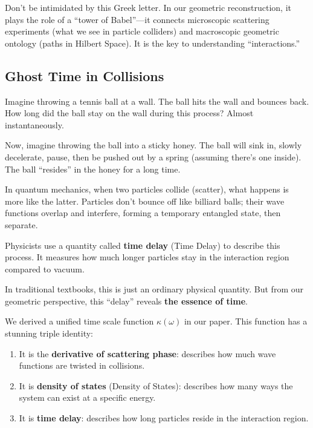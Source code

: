 \documentclass[11pt,a4paper,twoside]{book}
\begin{document}
Don't be intimidated by this Greek letter. In our geometric reconstruction, it plays the role of a ``tower of Babel''---it connects microscopic scattering experiments (what we see in particle colliders) and macroscopic geometric ontology (paths in Hilbert Space). It is the key to understanding ``interactions.''

\subsection{Ghost Time in Collisions}

Imagine throwing a tennis ball at a wall. The ball hits the wall and bounces back. How long did the ball stay on the wall during this process? Almost instantaneously.

Now, imagine throwing the ball into a sticky honey. The ball will sink in, slowly decelerate, pause, then be pushed out by a spring (assuming there's one inside). The ball ``resides'' in the honey for a long time.

In quantum mechanics, when two particles collide (scatter), what happens is more like the latter. Particles don't bounce off like billiard balls; their wave functions overlap and interfere, forming a temporary entangled state, then separate.

Physicists use a quantity called \textbf{time delay} (Time Delay) to describe this process. It measures how much longer particles stay in the interaction region compared to vacuum.

In traditional textbooks, this is just an ordinary physical quantity. But from our geometric perspective, this ``delay'' reveals \textbf{the essence of time}.

We derived a unified time scale function $\kappa(\omega)$ in our paper. This function has a stunning triple identity:

\begin{enumerate}
\item It is the \textbf{derivative of scattering phase}: describes how much wave functions are twisted in collisions.

\item It is \textbf{density of states} (Density of States): describes how many ways the system can exist at a specific energy.

\item It is \textbf{time delay}: describes how long particles reside in the interaction region.
\end{enumerate}
\end{document}
